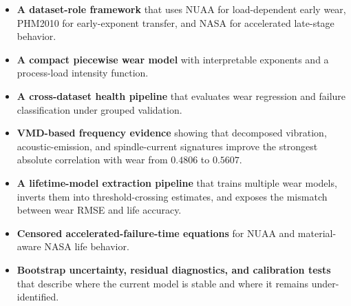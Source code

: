 \documentclass[11pt,a4paper]{article}
\begin{document}
\begin{itemize}
  \item \textbf{A dataset-role framework} that uses NUAA for load-dependent early wear, PHM2010 for early-exponent transfer, and NASA for accelerated late-stage behavior.
  \item \textbf{A compact piecewise wear model} with interpretable exponents and a process-load intensity function.
  \item \textbf{A cross-dataset health pipeline} that evaluates wear regression and failure classification under grouped validation.
  \item \textbf{VMD-based frequency evidence} showing that decomposed vibration, acoustic-emission, and spindle-current signatures improve the strongest absolute correlation with wear from \(0.4806\) to \(\mathbf{0.5607}\).
  \item \textbf{A lifetime-model extraction pipeline} that trains multiple wear models, inverts them into threshold-crossing estimates, and exposes the mismatch between wear RMSE and life accuracy.
  \item \textbf{Censored accelerated-failure-time equations} for NUAA and material-aware NASA life behavior.
  \item \textbf{Bootstrap uncertainty, residual diagnostics, and calibration tests} that describe where the current model is stable and where it remains under-identified.
\end{itemize}
\end{document}
